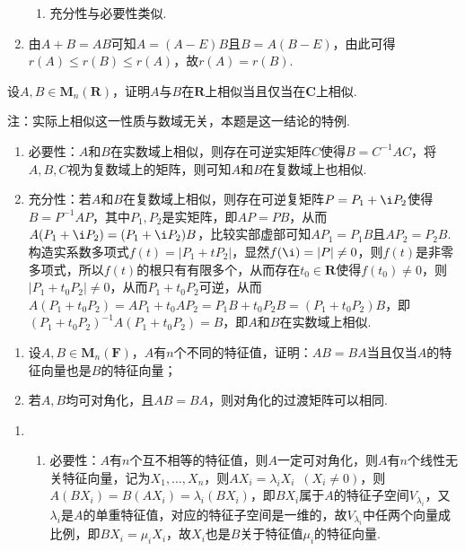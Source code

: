 \begin{exercise}
\begin{exgroup}
\begin{answer}
\begin{enumerate}
\begin{enumerate}
                          \item 充分性与必要性类似.
                      \end{enumerate}

                \item 由$A+B=AB$可知$A=(A-E)B$且$B=A(B-E)$，由此可得$r(A)\leqslant r(B)\leqslant r(A)$，故$r(A)=r(B)$.
            \end{enumerate}
        \end{answer}

        \item 设$A,B\in \mathbf{M}_n(\mathbf{R})$，证明$A$与$B$在$\mathbf{R}$上相似当且仅当在$\mathbf{C}$上相似.

        {\kaishu 注：实际上相似这一性质与数域无关，本题是这一结论的特例.}
        \begin{answer}
            \begin{enumerate}
                \item 必要性：$A$和$B$在实数域上相似，则存在可逆实矩阵$C$使得$B=C^{-1}AC$，将$A,B,C$视为复数域上的矩阵，则可知$A$和$B$在复数域上也相似.

                \item 充分性：若$A$和$B$在复数域上相似，则存在可逆复矩阵$P=P_1+\i P_2$使得$B=P^{-1}AP$，其中$P_1,P_2$是实矩阵，即$AP=PB$，从而$A(P_1+\i P_2)=(P_1+\i P_2)B$，比较实部虚部可知$AP_1=P_1B$且$AP_2=P_2B$. 构造实系数多项式$f(t)=|P_1+tP_2|$，显然$f(\i)=|P|\neq 0$，则$f(t)$是非零多项式，所以$f(t)$的根只有有限多个，从而存在$t_0\in\mathbf{R}$使得$f(t_0)\neq 0$，则$|P_1+t_0P_2|\neq 0$，从而$P_1+t_0P_2$可逆，从而$A(P_1+t_0P_2)=AP_1+t_0AP_2=P_1B+t_0P_2B=(P_1+t_0P_2)B$，即$(P_1+t_0P_2)^{-1}A(P_1+t_0P_2)=B$，即$A$和$B$在实数域上相似.
            \end{enumerate}
        \end{answer}

        \item \begin{enumerate}
            \item 设$A,B\in \mathbf{M}_n(\mathbf{F})$，$A$有$n$个不同的特征值，证明：$AB=BA$当且仅当$A$的特征向量也是$B$的特征向量；

            \item 若$A,B$均可对角化，且$AB=BA$，则对角化的过渡矩阵可以相同.
        \end{enumerate}
        \begin{answer} \label{ex:交换对角化}
            \begin{enumerate}
                \item \begin{enumerate}
                          \item 必要性：$A$有$n$个互不相等的特征值，则$A$一定可对角化，则$A$有$n$个线性无关特征向量，记为$X_1,\ldots,X_n$，则$AX_i=\lambda_iX_i\enspace (X_i\neq 0)$，则$A(BX_i)=B(AX_i)=\lambda_i(BX_i)$，即$BX_i$属于$A$的特征子空间$V_{\lambda_i}$，又$\lambda_i$是$A$的单重特征值，对应的特征子空间是一维的，故$V_{\lambda_i}$中任两个向量成比例，即$BX_i=\mu_iX_i$，故$X_i$也是$B$关于特征值$\mu_i$的特征向量.


\end{enumerate}
\end{enumerate}
\end{answer}
\end{exgroup}
\end{exercise}
